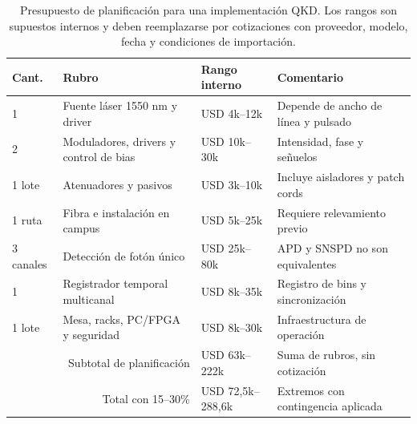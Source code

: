 \begin{table}[H]
  \centering
  \small
  \begin{tabularx}{\textwidth}{p{}p{}p{}X}
    \toprule
    Cant. & Rubro & Rango interno & Comentario \\
    \midrule
    1 & Fuente láser 1550 nm y driver & USD 4k--12k & Depende de ancho de línea y pulsado \\
    2 & Moduladores, drivers y control de bias & USD 10k--30k & Intensidad, fase y señuelos \\
    1 lote & Atenuadores y pasivos & USD 3k--10k & Incluye aisladores y patch cords \\
    1 ruta & Fibra e instalación en campus & USD 5k--25k & Requiere relevamiento previo \\
    3 canales & Detección de fotón único & USD 25k--80k & APD y SNSPD no son equivalentes \\
    1 & Registrador temporal multicanal & USD 8k--35k & Registro de bins y sincronización \\
    1 lote & Mesa, racks, PC/FPGA y seguridad & USD 8k--30k & Infraestructura de operación \\
    \multicolumn{2}{r}{Subtotal de planificación} & USD 63k--222k & Suma de rubros, sin cotización \\
    \multicolumn{2}{r}{Total con 15--30\%} & USD 72,5k--288,6k & Extremos con contingencia aplicada \\
    \bottomrule
  \end{tabularx}
  \caption{Presupuesto de planificación para una implementación QKD. Los rangos son supuestos internos y deben reemplazarse por cotizaciones con proveedor, modelo, fecha y condiciones de importación.}
  \label{tab:presupuesto_unsam}
\end{table}
